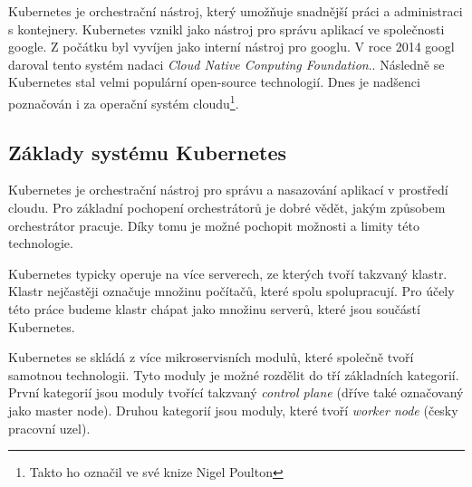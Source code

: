 \bigskip\medskip
Kubernetes je orchestrační nástroj, který umožňuje snadnější práci a administraci s kontejnery. Kubernetes vznikl jako nástroj pro správu aplikací ve společnosti google. Z počátku byl vyvíjen jako interní nástroj pro googlu. V roce 2014 googl daroval tento systém nadaci \textit{Cloud Native Conputing Foundation}.\cite{poulton_2022_the}. Následně se Kubernetes stal velmi populární open-source technologií. Dnes je nadšenci poznačován i za operační systém cloudu\footnote{Takto ho označil ve své knize Nigel Poulton\cite{poulton_2022_the}}.


\subsection{Základy systému Kubernetes}

Kubernetes je orchestrační nástroj pro správu a nasazování aplikací v prostředí cloudu. Pro základní pochopení orchestrátorů je dobré vědět, jakým způsobem orchestrátor pracuje. Díky tomu je možné pochopit možnosti a limity této technologie.

Kubernetes typicky operuje na více serverech, ze kterých tvoří takzvaný klastr. Klastr nejčastěji označuje množinu počítačů, které spolu spolupracují. Pro účely této práce budeme klastr chápat jako množinu serverů, které jsou součástí Kubernetes.

Kubernetes se skládá z více mikroservisních modulů, které společně tvoří samotnou technologii. Tyto moduly je možné rozdělit do tří základních kategorií. První kategorií jsou moduly tvořící takzvaný \textit{control plane} (dříve také označovaný jako master node). Druhou kategorií jsou moduly, které tvoří \textit{worker node} (česky pracovní uzel).

